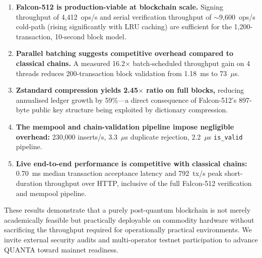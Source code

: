 \documentclass[11pt,a4paper]{article}
\begin{document}
\begin{enumerate}
  \item \textbf{Falcon-512 is production-viable at blockchain scale.}
        Signing throughput of 4,412~ops/s and serial verification throughput
        of $\sim$9,600~ops/s cold-path (rising significantly with LRU caching)
        are sufficient for the 1,200-transaction, 10-second block model.
  \item \textbf{Parallel batching suggests competitive overhead compared to classical chains.}
        A measured 16.2$\times$ batch-scheduled throughput gain on 4 threads reduces
        200-transaction block validation from 1.18~ms to 73~$\mu$s.
  \item \textbf{Zstandard compression yields 2.45$\times$ ratio on full blocks,}
        reducing annualised ledger growth by 59\%---a direct consequence of
        Falcon-512's 897-byte public key structure being exploited by
        dictionary compression.
  \item \textbf{The mempool and chain-validation pipeline impose negligible
        overhead:} 230,000 inserts/s, 3.3~$\mu$s duplicate rejection,
        2.2~$\mu$s \texttt{is\_valid} pipeline.
  \item \textbf{Live end-to-end performance is competitive with classical chains:}
        0.70~ms median transaction acceptance latency and 792~tx/s peak short-duration
        throughput over HTTP, inclusive of the full Falcon-512 verification
        and mempool pipeline.
\end{enumerate}

These results demonstrate that a purely post-quantum blockchain is not merely
academically feasible but practically deployable on commodity hardware
without sacrificing the throughput required for operationally
practical environments. We invite external security audits and multi-operator testnet
participation to advance QUANTA toward mainnet readiness.
\end{document}
